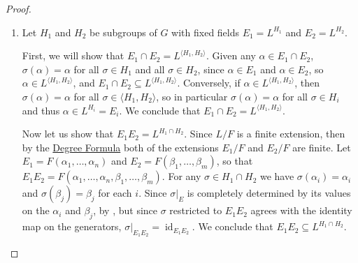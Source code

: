 \documentclass[12pt]{report}
\numberwithin{equation}{section}
\numberwithin{theorem}{chapter}
\theoremstyle{definition}
\newtheorem*{basic properties}{Basic Properties}
\newtheorem*{Important Remark}{Important Remark}
\DeclareMathOperator{\Gal}{Gal}
\DeclareMathOperator{\id}{id}
\begin{document}
\begin{proof}
\begin{enumerate}[leftmargin=20pt,label=(\alph*)]
For each $\sigma \in G$, we claim that $\sigma(E) \subseteq E$. By , for all $\alpha \in E$ the element $\sigma(\alpha)$ is also a root of $m_{\alpha,F}$. But since $E/F$ is Galois, it must contain all of the roots of $m_{\alpha,F}$, by , so $\sigma(\alpha) \in E$. Thus $\sigma(E) \subseteq E$, so the restriction of $\sigma$ to $E$ determines an injective field homomorphism $\sigma|_E: E \to E$. Since $\sigma|_F = \id_F$, this map is also a linear transformation of vector spaces over $F$. But $E$ is a finite vector space over $F$, and any injective linear transformation $E \to E$ must be bijective. We conclude that $\sigma|_E$ is an automorphism of $E$. We thus have a well-defined function
$$\xymatrix@R=1mm{\phi: G \ar[r] & \Gal(E/F) \\ \sigma \ar@{|->}[r] & \phi(\sigma) = \sigma|_E.}$$
Moreover, this map is a group homomorphism by construction. The kernel is the subgroup of $G$ of automorphisms that restrict to the identity on $E$, which is precisely $N$. Hence we have an induced injective group homomorphism
$$\overline{\phi}: G/N \to \Gal(E/F).$$
But $|N| = |\Gal(E/F)|<\infty$, so this map $\overline{\phi}$ must be an isomorphism.

\item Let $H_1$ and $H_2$ be subgroups of $G$ with fixed fields $E_1 = L^{H_1}$ and $E_2 = L^{H_2}$. 

First, we will show that $E_1 \cap E_2 = L^{\langle H_1, H_2 \rangle}$.
Given any $\alpha \in E_1 \cap E_2$, $\sigma(\alpha) = \alpha$ for all $\sigma \in H_1$ and all $\sigma \in H_2$, since $\alpha \in E_1$ and $\alpha \in E_2$, so $\alpha \in L^{\langle H_1, H_2 \rangle}$, and $E_1 \cap E_2 \subseteq L^{\langle H_1, H_2 \rangle}$. Conversely, if $\alpha \in L^{\langle H_1, H_2 \rangle}$, then $\sigma(\alpha) = \alpha$ for all $\sigma \in \langle H_1, H_2 \rangle$, so in particular $\sigma(\alpha) = \alpha$ for all $\sigma \in H_i$ and thus $\alpha \in L^{H_i} = E_i$. We conclude that $E_1 \cap E_2 = L^{\langle H_1, H_2 \rangle}$.

Now let us show that $E_1 E_2 = L^{H_1 \cap H_2}$. Since $L/F$ is a finite extension, then by the \hyperref[deg formula]{Degree Formula} both of the extensions $E_1/F$ and $E_2/F$ are finite. Let $E_1 = F(\alpha_1, \ldots, \alpha_n)$ and $E_2 = F(\beta_1, \ldots, \beta_m)$, so that $E_1E_2 = F(\alpha_1, \ldots, \alpha_n, \beta_1, \ldots, \beta_m)$. For any $\sigma \in H_1 \cap H_2$ we have $\sigma(\alpha_i) = \alpha_i$ and $\sigma(\beta_j) = \beta_j$ for each $i$. Since $\sigma|_E$ is completely determined by its values on the $\alpha_i$ and $\beta_j$, by , but since $\sigma$ restricted to $E_1E_2$ agrees with the identity map on the generators, $\sigma|_{E_1 E_2} = \id_{E_1 E_2}$. We conclude that $E_1 E_2 \subseteq L^{H_1 \cap H_2}$.


\end{enumerate}
\end{proof}
\end{document}
